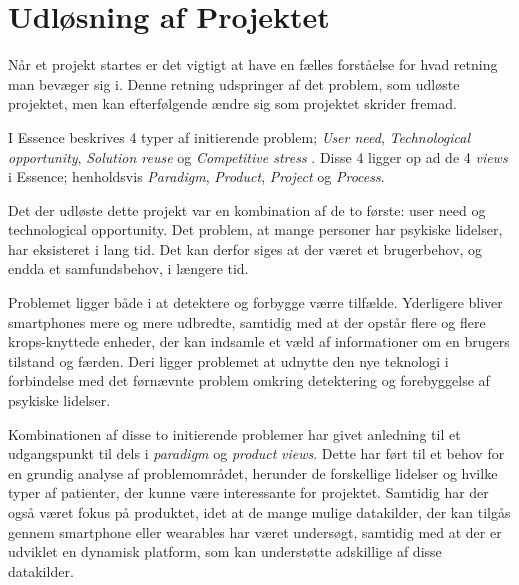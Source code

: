\section{Udløsning af Projektet}
Når et projekt startes er det vigtigt at have en fælles forståelse for hvad retning man bevæger sig i.
Denne retning udspringer af det problem, som udløste projektet, men kan efterfølgende ændre sig som projektet skrider fremad.

I Essence beskrives 4 typer af initierende problem; \textit{User need}, \textit{Technological opportunity}, \textit{Solution reuse} og \textit{Competitive stress} \citet[Kapitel 4 - Orientation]{art:essence}.
Disse 4 ligger op ad de 4 \textit{views} i Essence; henholdsvis \textit{Paradigm}, \textit{Product}, \textit{Project} og \textit{Process}.

Det der udløste dette projekt var en kombination af de to første: user need og technological opportunity.
Det problem, at mange personer har psykiske lidelser, har eksisteret i lang tid.
Det kan derfor siges at der været et brugerbehov, og endda et samfundsbehov, i længere tid.

Problemet ligger både i at detektere og forbygge værre tilfælde.
Yderligere bliver smartphones mere og mere udbredte, samtidig med at der opstår flere og flere krops-knyttede enheder, der kan indsamle et væld af informationer om en brugers tilstand og færden.
Deri ligger problemet at udnytte den nye teknologi i forbindelse med det førnævnte problem omkring detektering og forebyggelse af psykiske lidelser.

Kombinationen af disse to initierende problemer har givet anledning til et udgangspunkt til dels i \textit{paradigm} og \textit{product} \textit{views}.
Dette har ført til et behov for en grundig analyse af problemområdet, herunder de forskellige lidelser og hvilke typer af patienter, der kunne være interessante for projektet.
Samtidig har der også været fokus på produktet, idet at de mange mulige datakilder, der kan tilgås gennem smartphone eller wearables har været undersøgt, samtidig med at der er udviklet en dynamisk platform, som kan understøtte adskillige af disse datakilder.
